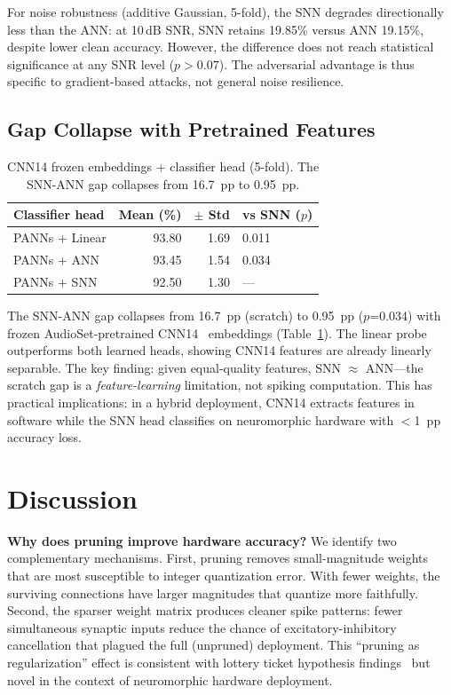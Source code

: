 \documentclass[sigconf,nonacm=false]{acmart}
\begin{document}
For noise robustness (additive Gaussian, 5-fold), the SNN degrades directionally less than the ANN: at 10\,dB SNR, SNN retains 19.85\% versus ANN 19.15\%, despite lower clean accuracy.
However, the difference does not reach statistical significance at any SNR level ($p>0.07$).
The adversarial advantage is thus specific to gradient-based attacks, not general noise resilience.

\subsection{Gap Collapse with Pretrained Features}

\begin{table}[t]
\caption{CNN14 frozen embeddings + classifier head (5-fold). The SNN-ANN gap collapses from 16.7~pp to 0.95~pp.}
\label{tab:panns}
\small
\begin{tabular}{@{}lrrl@{}}
\toprule
Classifier head & Mean (\%) & $\pm$ Std & vs SNN ($p$) \\
\midrule
PANNs + Linear & 93.80 & 1.69 & 0.011 \\
PANNs + ANN & 93.45 & 1.54 & 0.034 \\
PANNs + SNN & 92.50 & 1.30 & --- \\
\bottomrule
\end{tabular}
\end{table}

The SNN-ANN gap collapses from 16.7~pp (scratch) to 0.95~pp ($p$=0.034) with frozen AudioSet-pretrained CNN14~\cite{kong2020} embeddings (Table~\ref{tab:panns}).
The linear probe outperforms both learned heads, showing CNN14 features are already linearly separable.
The key finding: given equal-quality features, SNN $\approx$ ANN---the scratch gap is a \emph{feature-learning} limitation, not spiking computation.
This has practical implications: in a hybrid deployment, CNN14 extracts features in software while the SNN head classifies on neuromorphic hardware with $<$1~pp accuracy loss.


\section{Discussion}
\label{sec:discussion}

\textbf{Why does pruning improve hardware accuracy?}
We identify two complementary mechanisms.
First, pruning removes small-magnitude weights that are most susceptible to integer quantization error.
With fewer weights, the surviving connections have larger magnitudes that quantize more faithfully.
Second, the sparser weight matrix produces cleaner spike patterns: fewer simultaneous synaptic inputs reduce the chance of excitatory-inhibitory cancellation that plagued the full (unpruned) deployment.
This ``pruning as regularization'' effect is consistent with lottery ticket hypothesis findings~\cite{eshraghian2023} but novel in the context of neuromorphic hardware deployment.
\end{document}
